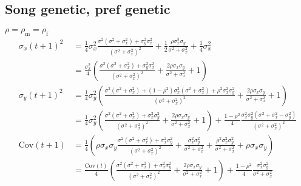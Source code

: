 \documentclass{article}
\newcommand{\x}[1]{\text{#1}}
\newcommand{\Cov}{\text{Cov}}
\begin{document}
\subsection{Song genetic, pref genetic } 
$\rho=\rho_\x{m}=\rho_\x{f}$
\begin{align*}
\sigma_x(t+1)^2&=\frac{1}{4}\sigma_x^2\frac{\sigma^2(\sigma^2+\sigma_x^2)+\sigma_y^2\sigma_x^2}{(\sigma^2+\sigma_x^2)^2}+\frac{1}{2}\frac{\rho\sigma_x^3\sigma_y}{\sigma^2+\sigma_x^2}+\frac{1}{4}\sigma_x^2
\\&=\frac{\sigma_x^2}{4}\left(\frac{\sigma^2(\sigma^2+\sigma_x^2)+\sigma_y^2\sigma_x^2}{(\sigma^2+\sigma_x^2)^2}+\frac{2\rho\sigma_x\sigma_y}{\sigma^2+\sigma_x^2}+1\right)
\\\sigma_y(t+1)^2&=\frac{1}{4}\sigma_y^2\left(\frac{\sigma^2(\sigma^2+\sigma_x^2)+(1-\rho^2)\sigma_x^2(\sigma^2+\sigma_x^2)+\rho^2\sigma_x^2\sigma_y^2}{(\sigma^2+\sigma_x^2)^2}+\frac{2\rho\sigma_x\sigma_y}{\sigma^2+\sigma_x^2}+1\right)
\\&=\frac{1}{4}\sigma_y^2\left(\frac{\sigma^2(\sigma^2+\sigma_x^2)+\sigma_x^2\sigma_y^2}{(\sigma^2+\sigma_x^2)^2}+\frac{2\rho\sigma_x\sigma_y}{\sigma^2+\sigma_x^2}+1\right)+\frac{1-\rho^2}{4}\frac{\sigma_x^2\sigma_y^2(\sigma^2+\sigma_x^2-\sigma_y^2)}{(\sigma^2+\sigma_x^2)^2}
\\ \Cov(t+1)&=\frac{1}{4}\left(\rho\sigma_x\sigma_y\frac{\sigma^2(\sigma^2+\sigma_x^2)+\sigma_x^2\sigma_y^2}{(\sigma^2+\sigma_x^2)^2}+\frac{\sigma_x^2\sigma_y^2}{\sigma^2+\sigma_x^2}+\frac{\rho^2\sigma_x^2\sigma_y^2}{\sigma^2+\sigma_x^2}+\rho\sigma_x\sigma_y\right)
\\&=\frac{\Cov(t)}{4}\left(\frac{\sigma^2(\sigma^2+\sigma_x^2)+\sigma_x^2\sigma_y^2}{(\sigma^2+\sigma_x^2)^2}+\frac{2\rho\sigma_x\sigma_y}{\sigma^2+\sigma_x^2}+1\right)+\frac{1-\rho^2}{4}\frac{\sigma_x^2\sigma_y^2}{\sigma^2+\sigma_x^2}
\end{align*}
\end{document}
